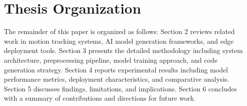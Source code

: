 \section{Thesis Organization}

The remainder of this paper is organized as follows: Section 2 reviews related work in motion tracking systems, AI model generation frameworks, and edge deployment tools. Section 3 presents the detailed methodology including system architecture, preprocessing pipeline, model training approach, and code generation strategy. Section 4 reports experimental results including model performance metrics, deployment characteristics, and comparative analysis. Section 5 discusses findings, limitations, and implications. Section 6 concludes with a summary of contributions and directions for future work.